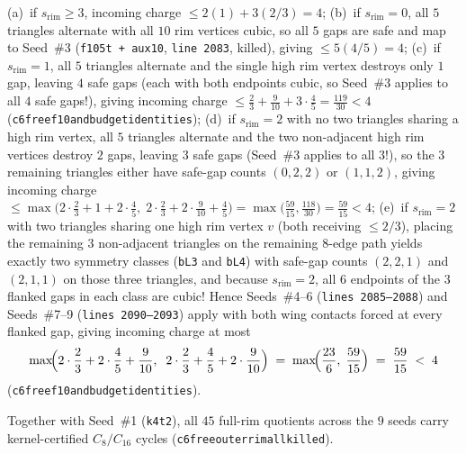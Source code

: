 \documentclass[11pt,reqno]{amsart}
\theoremstyle{plain}
\theoremstyle{definition}
\theoremstyle{remark}
\DeclareRobustCommand{\_}{\ifmmode\text{\textunderscore}\else\textunderscore\allowbreak\fi}
\begin{document}
\begin{itemize}[leftmargin=1.8em]
\begin{itemize}[leftmargin=1.4em]
      (a)~if $s_{\mathrm{rim}} \ge 3$, incoming charge $\le 2(1) + 3(2/3) = 4$;
      (b)~if $s_{\mathrm{rim}} = 0$, all $5$ triangles alternate with all $10$ rim vertices cubic, so all $5$ gaps are safe and map to Seed~\#3 (\texttt{f10\_5t + aux10}, \texttt{line 2083}, killed), giving $\le 5(4/5) = 4$;
      (c)~if $s_{\mathrm{rim}} = 1$, all $5$ triangles alternate and the single high rim vertex destroys only $1$ gap, leaving $4$ safe gaps (each with both endpoints cubic, so Seed~\#3 applies to all $4$ safe gaps!), giving incoming charge $\le \frac{2}{3} + \frac{9}{10} + 3 \cdot \frac{4}{5} = \frac{119}{30} < 4$ (\texttt{c6free\_f10\_and\_budget\_identities});
      (d)~if $s_{\mathrm{rim}} = 2$ with no two triangles sharing a high rim vertex, all $5$ triangles alternate and the two non-adjacent high rim vertices destroy $2$ gaps, leaving $3$ safe gaps (Seed~\#3 applies to all $3$!), so the $3$ remaining triangles either have safe-gap counts $(0, 2, 2)$ or $(1, 1, 2)$, giving incoming charge $\le \max\!\bigl(2 \cdot \frac{2}{3} + 1 + 2 \cdot \frac{4}{5},\; 2 \cdot \frac{2}{3} + 2 \cdot \frac{9}{10} + \frac{4}{5}\bigr) = \max\!\bigl(\frac{59}{15}, \frac{118}{30}\bigr) = \frac{59}{15} < 4$;
      (e)~if $s_{\mathrm{rim}} = 2$ with two triangles sharing one high rim vertex $v$ (both receiving $\le 2/3$), placing the remaining $3$ non-adjacent triangles on the remaining $8$-edge path yields exactly two symmetry classes (\texttt{b\_L3} and \texttt{b\_L4}) with safe-gap counts $(2, 2, 1)$ and $(2, 1, 1)$ on those three triangles, and because $s_{\mathrm{rim}} = 2$, all $6$ endpoints of the $3$ flanked gaps in each class are cubic! Hence Seeds~\#4--6 (\texttt{lines 2085--2088}) and Seeds~\#7--9 (\texttt{lines 2090--2093}) apply with both wing contacts forced at every flanked gap, giving incoming charge at most
      \[
        \max\!\Bigl(2\cdot\frac{2}{3} + 2\cdot\frac{4}{5} + \frac{9}{10},\;\; 2\cdot\frac{2}{3} + \frac{4}{5} + 2\cdot\frac{9}{10}\Bigr) \;=\; \max\!\Bigl(\frac{23}{6},\; \frac{59}{15}\Bigr) \;=\; \frac{59}{15} \;<\; 4
      \]
      (\texttt{c6free\_f10\_and\_budget\_identities}).
  \end{itemize}
  Together with Seed~\#1 (\texttt{k4t2}), all $45$ full-rim quotients across the $9$ seeds carry kernel-certified $C_8/C_{16}$ cycles (\texttt{c6free\_outer\_rim\_all\_killed}).


\end{itemize}
\end{document}
